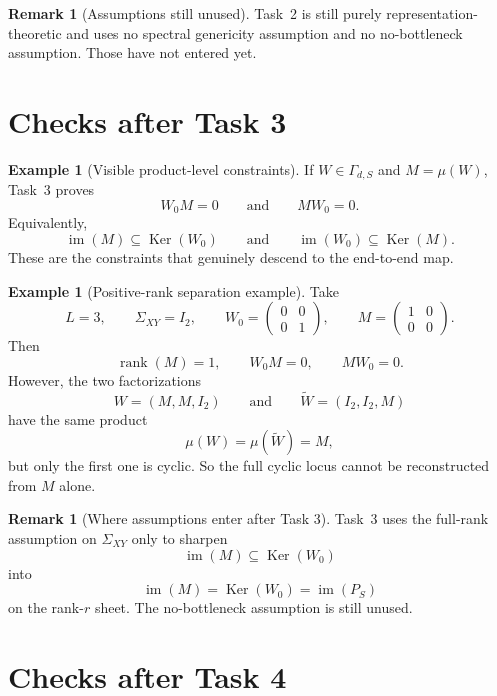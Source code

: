 \documentclass{article}
\newcommand{\rk}{\operatorname{rank}}
\newcommand{\im}{\operatorname{im}}
\newcommand{\Ker}{\operatorname{Ker}}
\theoremstyle{definition}
\newtheorem{remark}[theorem]{Remark}
\newtheorem{example}[theorem]{Example}
\begin{document}
\begin{remark}[Assumptions still unused]
Task~2 is still purely representation-theoretic and uses no spectral genericity assumption and no no-bottleneck assumption. Those have not entered yet.
\end{remark}

\section{Checks after Task 3}

\begin{example}[Visible product-level constraints]
If $W\in \Gamma_{d,S}$ and $M=\mu(W)$, Task~3 proves
\[
W_0M=0
\qquad\text{and}\qquad
MW_0=0.
\]
Equivalently,
\[
\im(M)\subseteq \Ker(W_0)
\qquad\text{and}\qquad
\im(W_0)\subseteq \Ker(M).
\]
These are the constraints that genuinely descend to the end-to-end map.
\end{example}

\begin{example}[Positive-rank separation example]
Take
\[
L=3,
\qquad
\Sigma_{XY}=I_2,
\qquad
W_0=
\begin{pmatrix}
0&0\\
0&1
\end{pmatrix},
\qquad
M=
\begin{pmatrix}
1&0\\
0&0
\end{pmatrix}.
\]
Then
\[
\rk(M)=1,
\qquad
W_0M=0,
\qquad
MW_0=0.
\]
However, the two factorizations
\[
W=(M,M,I_2)
\qquad\text{and}\qquad
\widetilde W=(I_2,I_2,M)
\]
have the same product
\[
\mu(W)=\mu(\widetilde W)=M,
\]
but only the first one is cyclic. So the full cyclic locus cannot be reconstructed from $M$ alone.
\end{example}

\begin{remark}[Where assumptions enter after Task 3]
Task~3 uses the full-rank assumption on $\Sigma_{XY}$ only to sharpen
\[
\im(M)\subseteq \Ker(W_0)
\]
into
\[
\im(M)=\Ker(W_0)=\im(P_S)
\]
on the rank-$r$ sheet. The no-bottleneck assumption is still unused.
\end{remark}

\section{Checks after Task 4}
\end{document}
